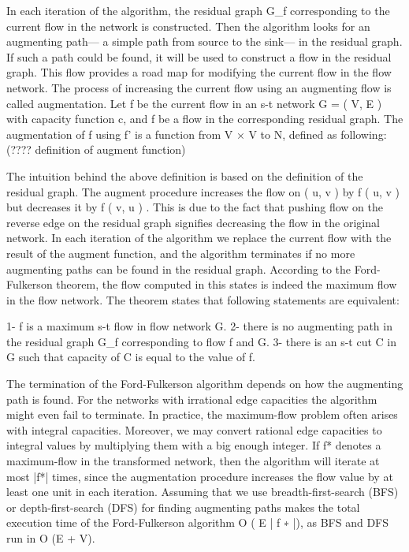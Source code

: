 \documentclass{llncs}
\begin{document}
In each iteration of the algorithm, the residual graph G_f corresponding to the current flow in the network is constructed. Then the algorithm looks for an augmenting path--- a simple path from source to the sink--- in the residual graph. If such a path could be found, it will be used to construct a flow in the residual graph. This flow provides a road map for modifying the current flow in the flow network. The process of increasing the current flow using an augmenting flow is called augmentation. Let f be the current flow in an s-t network G = ( V, E ) with capacity function c, and f be a flow in the corresponding residual graph. The augmentation of f using f' is a function from V × V to N, defined as following:
(???? definition of augment function)

The intuition behind the above definition is based on the definition of the residual graph. The augment procedure increases the flow on ( u, v ) by f ( u, v ) but decreases it
by f ( v, u ) . This is due to the fact that pushing flow on the reverse edge on the residual graph signifies decreasing the flow in the original network. In each iteration of the algorithm we replace the current flow with the result of the augment function, and the algorithm terminates if no more augmenting paths can be found in the residual graph. According to the Ford-Fulkerson theorem, the flow computed in this states is indeed the maximum flow in the flow network. The theorem states that following statements are equivalent:

1- f is a maximum s-t flow in flow network G.
2- there is no augmenting path in the residual graph G_f corresponding to flow f and G.
3- there is an s-t cut C in G such that capacity of C is equal to the value of f.

The termination of the Ford-Fulkerson algorithm depends on how the augmenting path is found. For the networks with irrational edge capacities the algorithm might even fail to terminate. In practice, the maximum-flow problem often arises with integral capacities. Moreover, we may convert rational edge capacities to integral values by multiplying them with a big enough integer. If f* denotes a maximum-flow in the transformed network, then the algorithm will iterate at most |f*| times, since the augmentation procedure increases the flow value by at least one unit in each iteration. Assuming that we use breadth-first-search (BFS) or depth-first-search (DFS) for finding augmenting paths makes the total execution time of the Ford-Fulkerson algorithm O ( E | f ∗ |), as BFS and DFS run in O (E + V).
\end{document}
